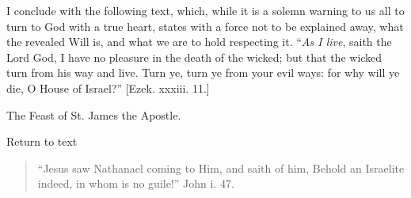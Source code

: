 I conclude with the following text, which, while it is a solemn
warning to us all to turn to God with a true heart, states with a force
not to be explained away, what the revealed Will is, and what we are to
hold respecting it. ``\emph{As I live}, saith the Lord God, I have no
pleasure in the death of the wicked; but that the wicked turn from his
way and live. Turn ye, turn ye from your evil ways: for why will ye die,
O House of Israel?'' [Ezek. xxxiii. 11.]


The Feast of St. James the Apostle.

Return to text


\begin{quote}

``Jesus saw Nathanael coming to Him, and saith of him, Behold
an Israelite indeed, in whom is no guile!'' John i. 47.

\end{quote}

